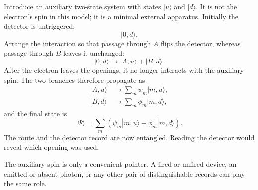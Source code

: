 Introduce an auxiliary two-state system with states \(|u\rangle\) and \(|d\rangle\). It is not the electron's spin in this model; it is a minimal external apparatus. Initially the detector is untriggered:
\begin{equation}
|0,d\rangle.
\end{equation}
Arrange the interaction so that passage through \(A\) flips the detector, whereas passage through \(B\) leaves it unchanged:
\begin{equation}
|0,d\rangle
\longrightarrow
|A,u\rangle+|B,d\rangle.
\end{equation}
After the electron leaves the openings, it no longer interacts with the auxiliary spin. The two branches therefore propagate as
\begin{align}
|A,u\rangle &\longrightarrow \sum_m\psi_m|m,u\rangle, \\
|B,d\rangle &\longrightarrow \sum_m\phi_m|m,d\rangle,
\end{align}
and the final state is
\begin{equation}
|\Psi\rangle
=\sum_m\left(\psi_m|m,u\rangle+\phi_m|m,d\rangle\right).
\end{equation}
The route and the detector record are now entangled. Reading the detector would reveal which opening was used.

\begin{classroomqa}
\end{classroomqa}

The auxiliary spin is only a convenient pointer. A fired or unfired device, an emitted or absent photon, or any other pair of distinguishable records can play the same role.

\begin{classroomqa}
\end{classroomqa}

